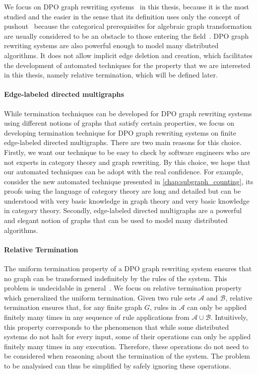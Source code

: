    We focus on DPO graph rewriting systems~\cite{corradini1997algebraic} in this thesis, because it is the most studied and the easier in the sense that its definition uses only the concept of pushout~\cite{pierce1991basic} because
   the categorical prerequisites for algebraic graph transformation are usually considered to be an obstacle to those entering the field~\cite{overbeekthesis}.
    DPO graph rewriting systems are also powerful enough to model many distributed algorithms.
    It does not allow implicit edge deletion and creation, which facilitates the development of automated techniques for the property that we are interested in this thesis, namely relative termination, which will be defined later.



\paragraph{Edge-labeled directed multigraphs}
 While termination techniques can be developed for DPO graph rewriting systems using different notions of graphs that satisfy certain properties, we focus on developing termination technique for DPO graph rewriting systems on finite edge-labeled directed multigraphs.
 There are two main reasons for this choice.
 Firstly, we want our technique to be easy to check by software engineers who are not experts in category theory and graph rewriting.  
 By this choice, we hope that our automated techniques can be adopt with the real confidence.
 For example, consider the new automated technique presented in \autoref{chap:subgraph_counting}, its proofs using the language of category theory are long and detailed but can be understood with very basic knowledge in graph theory and very basic knowledge in category theory.
Secondly, edge-labeled directed multigraphs are a powerful and elegant notion of graphs that can be used to model many distributed algorithms.


\paragraph{Relative Termination}
The uniform termination property of a DPO graph rewriting system ensures that no graph can be transformed indefinitely by the rules of the system. This problem is undecidable in general~\cite{plump1998terminationundecidable}.
We focus on relative termination property~\cite{geser1990relative,bruggin15bruggink2015proving, endrullis2024generalized_icgt,overbeek2024termination_lmcs} which generalized the uniform termination.
 Given two rule sets \( \mathcal{A} \) and \( \mathcal{B} \), relative termination ensures that, for any finite graph $G$,
rules in $\mathcal{A}$ can only be applied finitely many times in any sequence of rule applications from $\mathcal{A} \cup \mathcal{B}$. Intuitively, this property corresponds to the phenomenon that while some distributed systems do not halt for every input, some of their operations can only be applied finitely many times in any execution. Therefore, these operations do not need to be considered when reasoning about the termination of the system. The problem to be analysised can thus be simplified by safely ignoring these operations.

